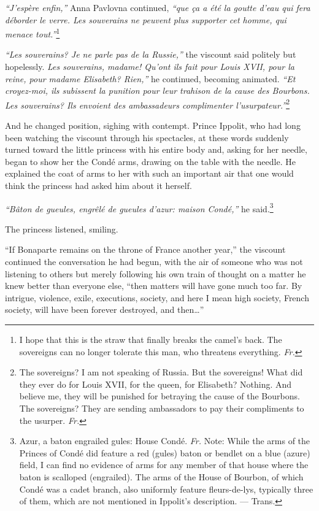 \textit{``J'esp\`ere enfin,''} Anna Pavlovna continued, \textit{``que \c ca a \'et\'e la goutte d'eau qui fera d\'eborder le verre. Les souverains ne peuvent plus supporter cet homme, qui menace tout.''}\footnote{I hope that this is the straw that finally breaks the camel's back. The sovereigns can no longer tolerate this man, who threatens everything. \textit{Fr.}}

\textit{``Les souverains? Je ne parle pas de la Russie,''} the viscount said politely but hopelessly. \textit{Les souverains, madame! Qu'ont ils fait pour Louis XVII, pour la reine, pour madame Elisabeth? Rien,''} he continued, becoming animated. \textit{``Et croyez-moi, ils subissent la punition pour leur trahison de la cause des Bourbons. Les souverains? Ils envoient des ambassadeurs complimenter l'usurpateur.''}\footnote{The sovereigns? I am not speaking of Russia. But the sovereigns! What did they ever do for Louis XVII, for the queen, for Elisabeth? Nothing. And believe me, they will be punished for betraying the cause of the Bourbons. The sovereigns? They are sending ambassadors to pay their compliments to the usurper. \textit{Fr.}}

And he changed position, sighing with contempt. Prince Ippolit, who had long been watching the viscount through his spectacles, at these words suddenly turned toward the little princess with his entire body and, asking for her needle, began to show her the Cond\'e arms, drawing on the table with the needle. He explained the coat of arms to her with such an important air that one would think the princess had asked him about it herself.

\textit{``B\^aton de gueules, engr\^el\'e de gueules d'azur: maison Cond\'e,''} he said.\footnote{Azur, a baton engrailed gules: House Cond\'e. \textit{Fr.} Note: While the arms of the Princes of Cond\'e did feature a red (gules) baton or bendlet on a blue (azure) field, I can find no evidence of arms for any member of that house where the baton is scalloped (engrailed). The arms of the House of Bourbon, of which Cond\'e was a cadet branch, also uniformly feature fleurs-de-lys, typically three of them, which are not mentioned in Ippolit's description. --- Trans.}

The princess listened, smiling.

``If Bonaparte remains on the throne of France another year,'' the viscount continued the conversation he had begun, with the air of someone who was not listening to others but merely following his own train of thought on a matter he knew better than everyone else, ``then matters will have gone much too far. By intrigue, violence, exile, executions, society, and here I mean high society, French society, will have been forever destroyed, and then\ldots'' %

